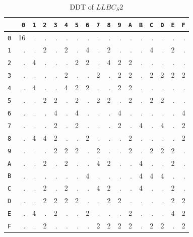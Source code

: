\begin{table}[t]
\centering
\caption{DDT of $LLBC_S2$}
\small
\begin{tabular}{r|rrrrrrrrrrrrrrrr}
 & \texttt{0} & \texttt{1} & \texttt{2} & \texttt{3} & \texttt{4} & \texttt{5} & \texttt{6} & \texttt{7} & \texttt{8} & \texttt{9} & \texttt{A} & \texttt{B} & \texttt{C} & \texttt{D} & \texttt{E} & \texttt{F} \\
\hline
\texttt{0} & 16 & . & . & . & . & . & . & . & . & . & . & . & . & . & . & . \\
\texttt{1} & . & . & 2 & . & 2 & . & 4 & . & 2 & . & . & . & 4 & . & 2 & . \\
\texttt{2} & . & 4 & . & . & . & 2 & 2 & . & 4 & 2 & 2 & . & . & . & . & . \\
\texttt{3} & . & . & . & . & 2 & . & . & 2 & . & 2 & 2 & . & 2 & 2 & 2 & 2 \\
\texttt{4} & . & 4 & . & . & 4 & 2 & 2 & . & . & 2 & 2 & . & . & . & . & . \\
\texttt{5} & . & . & 2 & 2 & . & 2 & . & 2 & 2 & . & 2 & . & 2 & 2 & . & . \\
\texttt{6} & . & . & . & 4 & . & 4 & . & . & . & 4 & . & . & . & . & . & 4 \\
\texttt{7} & . & . & . & 2 & . & 2 & . & . & . & 2 & . & 4 & . & 4 & . & 2 \\
\texttt{8} & . & 4 & 4 & 2 & . & . & 2 & . & . & . & 2 & . & . & . & . & 2 \\
\texttt{9} & . & . & . & 2 & 2 & 2 & . & 2 & . & . & 2 & . & 2 & 2 & 2 & . \\
\texttt{A} & . & . & 2 & . & 2 & . & . & 4 & 2 & . & . & 4 & . & . & 2 & . \\
\texttt{B} & . & . & . & . & . & . & 4 & . & . & . & . & 4 & 4 & 4 & . & . \\
\texttt{C} & . & . & 2 & . & 2 & . & . & 4 & 2 & . & . & 4 & . & . & 2 & . \\
\texttt{D} & . & . & 2 & 2 & 2 & 2 & . & . & 2 & 2 & . & . & . & . & 2 & 2 \\
\texttt{E} & . & 4 & . & 2 & . & . & 2 & . & . & . & 2 & . & . & . & 4 & 2 \\
\texttt{F} & . & . & 2 & . & . & . & . & 2 & 2 & 2 & 2 & . & 2 & 2 & . & 2 \\
\end{tabular}
\end{table}